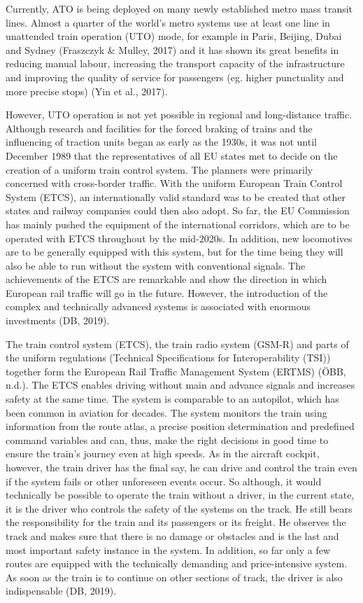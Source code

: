 \documentclass[
]{book}
\begin{document}
Currently, ATO is being deployed on many newly established metro mass transit lines. Almost a quarter of the world's metro systems use at least one line in unattended train operation (UTO) mode, for example in Paris, Beijing, Dubai and Sydney (Fraszczyk \& Mulley, 2017) and it has shown its great benefits in reducing manual labour, increasing the transport capacity of the infrastructure and improving the quality of service for passengers (eg. higher punctuality and more precise stops) (Yin et al., 2017).

However, UTO operation is not yet possible in regional and long-distance traffic. Although research and facilities for the forced braking of trains and the influencing of traction units began as early as the 1930s, it was not until December 1989 that the representatives of all EU states met to decide on the creation of a uniform train control system. The planners were primarily concerned with cross-border traffic. With the uniform European Train Control System (ETCS), an internationally valid standard was to be created that other states and railway companies could then also adopt. So far, the EU Commission has mainly pushed the equipment of the international corridors, which are to be operated with ETCS throughout by the mid-2020s. In addition, new locomotives are to be generally equipped with this system, but for the time being they will also be able to run without the system with conventional signals. The achievements of the ETCS are remarkable and show the direction in which European rail traffic will go in the future. However, the introduction of the complex and technically advanced systems is associated with enormous investments (DB, 2019).

The train control system (ETCS), the train radio system (GSM-R) and parts of the uniform regulations (Technical Specifications for Interoperability (TSI)) together form the European Rail Traffic Management System (ERTMS) (ÖBB, n.d.). The ETCS enables driving without main and advance signals and increases safety at the same time. The system is comparable to an autopilot, which has been common in aviation for decades. The system monitors the train using information from the route atlas, a precise position determination and predefined command variables and can, thus, make the right decisions in good time to ensure the train's journey even at high speeds. As in the aircraft cockpit, however, the train driver has the final say, he can drive and control the train even if the system fails or other unforeseen events occur. So although, it would technically be possible to operate the train without a driver, in the current state, it is the driver who controls the safety of the systems on the track. He still bears the responsibility for the train and its passengers or its freight. He observes the track and makes sure that there is no damage or obstacles and is the last and most important safety instance in the system. In addition, so far only a few routes are equipped with the technically demanding and price-intensive system. As soon as the train is to continue on other sections of track, the driver is also indispensable (DB, 2019).
\end{document}
